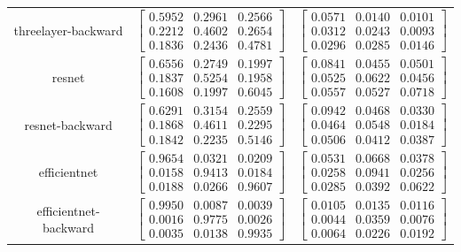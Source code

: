 \documentclass{article} %
\begin{document}
\begin{table}
\begin{tabular}{ccc}
threelayer-backward & $\begin{bmatrix}0.5952 & 0.2961 & 0.2566\\0.2212 & 0.4602 & 0.2654\\0.1836 & 0.2436 & 0.4781\end{bmatrix}$ & $\begin{bmatrix}0.0571 & 0.0140 & 0.0101\\0.0312 & 0.0243 & 0.0093\\0.0296 & 0.0285 & 0.0146\end{bmatrix}$\\
resnet & $\begin{bmatrix}0.6556 & 0.2749 & 0.1997\\0.1837 & 0.5254 & 0.1958\\0.1608 & 0.1997 & 0.6045\end{bmatrix}$ & $\begin{bmatrix}0.0841 & 0.0455 & 0.0501\\0.0525 & 0.0622 & 0.0456\\0.0557 & 0.0527 & 0.0718\end{bmatrix}$\\
resnet-backward & $\begin{bmatrix}0.6291 & 0.3154 & 0.2559\\0.1868 & 0.4611 & 0.2295\\0.1842 & 0.2235 & 0.5146\end{bmatrix}$ & $\begin{bmatrix}0.0942 & 0.0468 & 0.0330\\0.0464 & 0.0548 & 0.0184\\0.0506 & 0.0412 & 0.0387\end{bmatrix}$\\
efficientnet & $\begin{bmatrix}0.9654 & 0.0321 & 0.0209\\0.0158 & 0.9413 & 0.0184\\0.0188 & 0.0266 & 0.9607\end{bmatrix}$ & $\begin{bmatrix}0.0531 & 0.0668 & 0.0378\\0.0258 & 0.0941 & 0.0256\\0.0285 & 0.0392 & 0.0622\end{bmatrix}$\\
efficientnet-backward & $\begin{bmatrix}0.9950 & 0.0087 & 0.0039\\0.0016 & 0.9775 & 0.0026\\0.0035 & 0.0138 & 0.9935\end{bmatrix}$ & $\begin{bmatrix}0.0105 & 0.0135 & 0.0116\\0.0044 & 0.0359 & 0.0076\\0.0064 & 0.0226 & 0.0192\end{bmatrix}$\\

\end{tabular}
\end{table}
\end{document}
